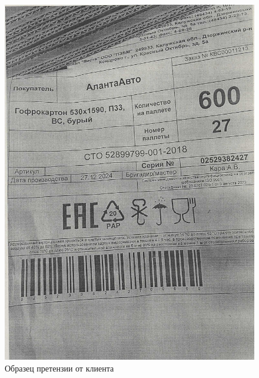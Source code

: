 \begin{figure}
\begin{center}
 \includegraphics[height=0.9\textheight, keepaspectratio]{Pics/Акт 3.jpg}
\end{center}
 \caption{Образец претензии от клиента}
 \label{pic:/Акт 3.}
\end{figure}

